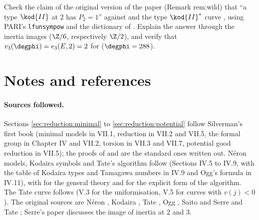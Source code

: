 \begin{exercise}\label{exer:reduction:typeII2}
Check the claim of the original version of the paper (Remark rem:wild) that ``a type $\kod{II}$ at $2$ has $P_2=1$'' against  and
the type $\kod{II}^*$ curve , using PARI's \texttt{lfunsympow} and the dictionary of . Explain
the answer through the inertia images ($\Z/6$, respectively $\Z/2$), and verify that $v_3(\degphi)=e_3(E,2)=2$ for 
($\degphi=288$).
\end{exercise}

\section{Notes and references}\label{sec:reduction:notes}

\paragraph{Sources followed.} Sections \ref{sec:reduction:minimal} to \ref{sec:reduction:potential} follow Silverman's first book
\cite[Chapter VII]{SilvermanAEC} (minimal models in VII.1, reduction in VII.2 and VII.5, the formal group in Chapter IV and VII.2, torsion
in VII.3 and VII.7, potential good reduction in VII.5); the proofs of  and  are
the standard ones written out. N\'eron models, Kodaira symbols and Tate's algorithm follow \cite[Chapter IV]{SilvermanATAEC} (Sections
IV.5 to IV.9, with the table of Kodaira types and Tamagawa numbers in IV.9 and Ogg's formula in IV.11), with \cite{BLR} for the general
theory and \cite[Section 3.2]{Cremona97} for the explicit form of the algorithm. The Tate curve follows \cite[Chapter V]{SilvermanATAEC}
(V.3 for the uniformisation, V.5 for curves with $v(j)<0$). The original sources are N\'eron \cite{NeronModels}, Kodaira \cite{Kodaira}, Tate
\cite{Tate75}, Ogg \cite{Ogg}, Saito \cite{Saito88} and Serre and Tate \cite{SerreTate68}; Serre's paper \cite[Section 5.6]{Serre72}
discusses the image of inertia at $2$ and $3$.

